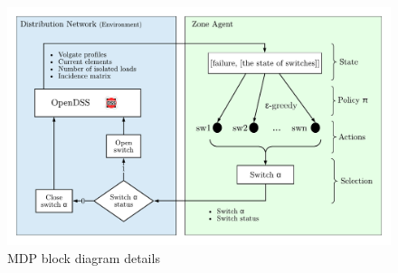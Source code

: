 \begin{figure}
    \centering
    \includegraphics{_chapter1/fig/mdp_blocks_details}
    \caption{MDP block diagram details}
    \label{ch1:fig:mdp_blocks_details}
\end{figure}
